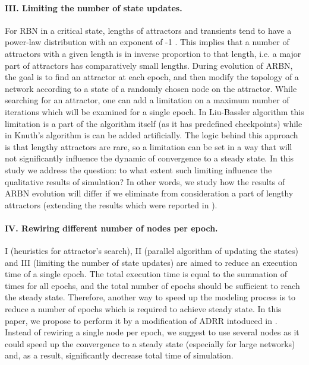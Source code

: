 \documentclass[procedia]{easychair}
\begin{document}
	\paragraph{III. Limiting the number of state updates.} For RBN in a critical state, lengths of attractors and transients tend to have a power-law distribution with an exponent of -1 \cite{greil2009attractor}. This implies that a number of attractors with a given length is in inverse proportion to that length, i.e. a major part of attractors has comparatively small lengths. During evolution of ARBN, the goal is to find an attractor at each epoch, and then modify the topology of a network according to a state of a randomly chosen node on the attractor. While searching for an attractor, one can add a limitation on a maximum number of iterations which will be examined for a single epoch. In Liu-Bassler algorithm this limitation is a part of the algorithm itself (as it has predefined checkpoints) while in Knuth's algorithm is can be added artificially. The logic behind this approach is that lengthy attractors are rare, so a limitation can be set in a way that will not significantly influence the dynamic of convergence to a steady state. In this study we address the question: to what extent such limiting influence the qualitative results of simulation? In other words, we study how the results of ARBN evolution will differ if we eliminate from consideration a part of lengthy attractors (extending the results which were reported in \cite{Gorski2016}).
	\paragraph{IV. Rewiring different number of nodes per epoch.} I (heuristics for attractor's search), II (parallel algorithm of updating the states) and III (limiting the number of state updates) are aimed to reduce an execution time of a single epoch. The total execution time is equal to the summation of times for all epochs, and the total number of epochs should be sufficient to reach the steady state. Therefore, another way to speed up the modeling process is to reduce a number of epochs which is required to achieve steady state. In this paper, we propose to perform it by a modification of ADRR intoduced in \cite{mlb}. Instead of rewiring a single node per epoch, we suggest to use several nodes as it could speed up the convergence to a steady state (especially for large networks) and, as a result, significantly decrease total time of simulation.
	
\end{document}

